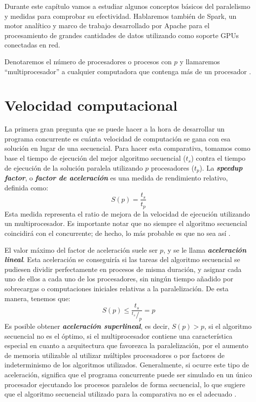 \vspace{10pt}
Durante este capítulo vamos a estudiar algunos conceptos básicos del paralelismo y medidas para comprobar su 
efectividad. Hablaremos también de Spark, un motor analítico y marco de trabajo desarrollado por Apache para el 
procesamiento de grandes cantidades de datos utilizando como soporte GPUs conectadas en red. 

\vspace{10pt}
Denotaremos el número de procesadores o procesos con $p$ y llamaremos ``multiprocesador'' a cualquier computadora 
que contenga más de un procesador \cite{wilkinson_allen_2005}.

\section{Velocidad computacional}

La primera gran pregunta que se puede hacer a la hora de desarrollar un programa concurrente es cuánta velocidad de
computación se gana con esa solución en lugar de una secuencial. Para hacer esta comparativa, tomamos como base el
tiempo de ejecución del mejor algoritmo secuencial ($t_s$) contra el tiempo de ejecución de la solución paralela
utilizando $p$ procesadores ($t_p$). La \textit{\textbf{speedup factor}}, o \textit{\textbf{factor de aceleración}} es 
una medida de rendimiento relativo, definida como:
\begin{equation}\label{eq:speedup}
    S(p)=\frac{t_s}{t_p}
\end{equation}
Esta medida representa el ratio de mejora de la velocidad de ejecución utilizando un multiprocesador. Es importante 
notar que no siempre el algoritmo secuencial coincidirá con el concurrente; de hecho, lo más probable es que no sea
así \cite{wilkinson_allen_2005}.

\vspace{10pt}
El valor máximo del factor de aceleración suele ser $p$, y se le llama \textbf{\textit{aceleración lineal}}. Esta
aceleración se conseguiría si las tareas del algoritmo secuencial se pudiesen dividir perfectamente en procesos de
misma duración, y asignar cada uno de ellos a cada uno de los procesadores, sin ningún tiempo añadido por sobrecargas o
computaciones iniciales relativas a la paralelización. De esta manera, tenemos que:
\begin{equation}
    S(p)\leq\frac{t_s}{^{t_s}/_{p}}=p
\end{equation}
Es posible obtener \textbf{\textit{aceleración superlineal}}, es decir, $S(p)>p$, si el algoritmo secuencial no es el
óptimo, si el multiprocesador contiene una característica especial en cuanto a arquitectura que favorezca la 
paralelización, por el aumento de memoria utilizable al utilizar múltiples procesadores o por factores de 
indeterminismo de los algoritmos utilizados. Generalmente, si ocurre este tipo de aceleración, significa que el
programa concurrente puede ser simulado en un único procesador ejecutando los procesos paralelos de forma secuencial, 
lo que sugiere que el algoritmo secuencial utilizado para la comparativa no es el adecuado \cite{wilkinson_allen_2005}.

